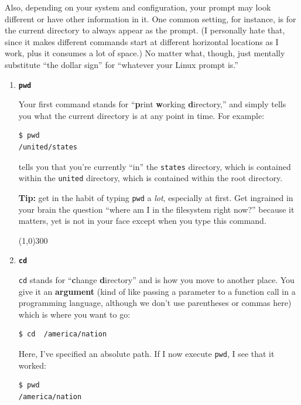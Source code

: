 Also, depending on your system and configuration, your prompt may look
different or have other information in it. One common setting, for instance,
is for the current directory to always appear as the prompt. (I personally
hate that, since it makes different commands start at different horizontal
locations as I work, plus it consumes a lot of space.) No matter what, though,
just mentally substitute ``the dollar sign'' for ``whatever your Linux prompt
is.''

\newcommand{\bigline}{\begin{center} \line(1,0){300} \end{center}}


\begin{enumerate}
\itemsep.1em
\item \textbf{\texttt{pwd}}

Your first command stands for ``\textbf{p}rint \textbf{w}orking
\textbf{d}irectory,'' and simply tells you what the current directory is at any
point in time. For example:

\begin{Verbatim}[fontsize=\small]
$ pwd
/united/states
\end{Verbatim}

tells you that you're currently ``in'' the \texttt{states} directory, which is
contained within the \texttt{united} directory, which is contained within the
root directory.

\textbf{Tip:} get in the habit of typing \texttt{pwd} a \textit{lot},
especially at first. Get ingrained in your brain the question ``where am I in
the filesystem right now?'' because it matters, yet is not in your face except
when you type this command.

\bigline
\item \textbf{\texttt{cd}}

\texttt{cd} stands for ``\textbf{c}hange \textbf{d}irectory'' and is how you
move to another place. You give it an \textbf{argument} (kind of like passing
a parameter to a function call in a programming language, although we don't
use parentheses or commas here) which is where you want to go:

\begin{Verbatim}[fontsize=\small]
$ cd  /america/nation
\end{Verbatim}

Here, I've specified an absolute path. If I now execute \texttt{pwd}, I see
that it worked:
\begin{Verbatim}[fontsize=\small]
$ pwd
/america/nation
\end{Verbatim}


\end{enumerate}

